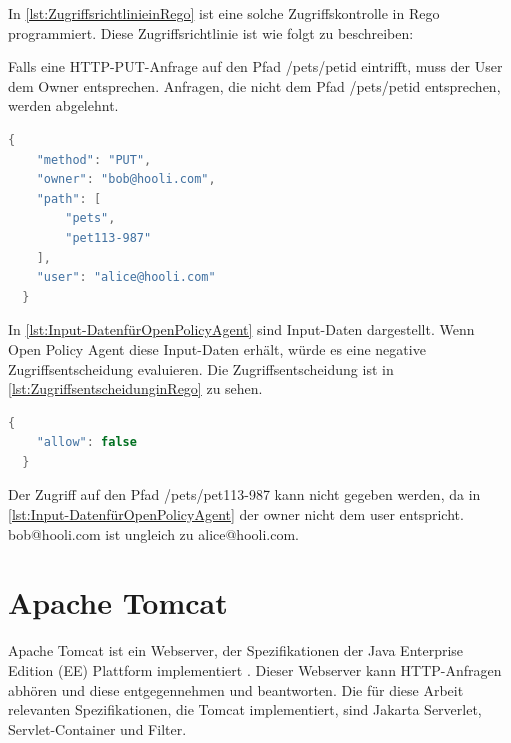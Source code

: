 In \autoref{lst:ZugriffsrichtlinieinRego} \citep{opaplayground:2021} ist eine solche Zugriffskontrolle in Rego programmiert. Diese Zugriffsrichtlinie ist wie folgt zu beschreiben:\smallskip

Falls eine HTTP-PUT-Anfrage auf den Pfad /pets/{petid} eintrifft, muss der User dem 
Owner entsprechen. Anfragen, die nicht dem Pfad /pets/{petid} entsprechen, werden abgelehnt. 

\begin{lstlisting}[language=C++,frame=tb,caption={Input-Daten für Open Policy Agent},label=lst:Input-DatenfürOpenPolicyAgent]
  {
    "method": "PUT",
    "owner": "bob@hooli.com",
    "path": [
        "pets",
        "pet113-987"
    ],
    "user": "alice@hooli.com"
  }
\end{lstlisting}
\smallskip

In \autoref{lst:Input-DatenfürOpenPolicyAgent} sind Input-Daten dargestellt. Wenn Open Policy Agent diese Input-Daten erhält, würde es eine negative Zugriffsentscheidung evaluieren. Die Zugriffsentscheidung ist in \autoref{lst:ZugriffsentscheidunginRego} zu sehen.

\begin{lstlisting}[language=C++,frame=tb,caption={Zugriffsentscheidung in Rego},label=lst:ZugriffsentscheidunginRego]
  {
    "allow": false
  }
\end{lstlisting}
\smallskip

Der Zugriff auf den Pfad /pets/pet113-987 kann nicht gegeben werden, da in \autoref{lst:Input-DatenfürOpenPolicyAgent} der owner nicht dem user entspricht. bob@hooli.com ist ungleich zu alice@hooli.com. 

\section{Apache Tomcat}
Apache Tomcat ist ein Webserver, der Spezifikationen der Java Enterprise Edition (EE) Plattform implementiert
\citep{tomcat:2021}. Dieser Webserver kann HTTP-Anfragen abhören und diese entgegennehmen und 
beantworten. Die für diese Arbeit relevanten Spezifikationen, die Tomcat implementiert, sind Jakarta Serverlet, Servlet-Container
und Filter.


